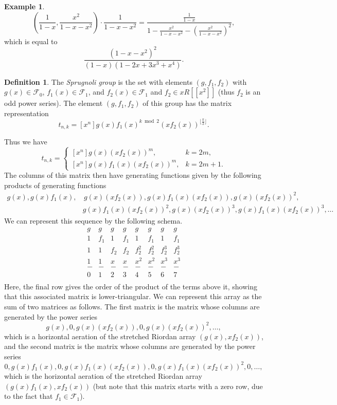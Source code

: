 \documentclass[12pt,reqno]{article}
\theoremstyle{definition}
\newtheorem{definition}[theorem]{Definition}
\newtheorem{example}[theorem]{Example}
\begin{document}
\begin{example}
$$\left(\frac{1}{1-x},\frac{x^2}{1-x-x^2}\right)\cdot \frac{1}{1-x-x^2}=\frac{\frac{1}{1-x}}{1-\frac{x^2}{1-x-x^2}-(\frac{x^2}{1-x-x^2})^2},$$ which is equal to
$$\frac{(1-x-x^2)^2}{(1-x)(1-2x+3x^3+x^4)}.$$
\end{example}

\begin{definition} The \emph{Sprugnoli group} is the set with elements $(g, f_1, f_2)$ with $g(x) \in \mathcal{F}_0$, $f_1(x) \in \mathcal{F}_1$, and $f_2(x) \in \mathcal{F}_1$ and
$f_2 \in xR[[x^2]]$ (thus $f_2$ is an odd power series). The element $(g, f_1, f_2)$ of this group has the matrix representation
$$t_{n,k} = [x^n] g(x)f_1(x)^{k \bmod 2} (xf_2(x))^{\lfloor \frac{k}{2} \rfloor}.$$
\end{definition}
Thus we have
$$
t_{n,k} =
\begin{cases}
  [x^n]g(x)(xf_2(x))^m, & k=2m, \\
  [x^n]g(x)f_1(x)(xf_2(x))^m,  & k=2m+1.
\end{cases}
$$
The columns of this matrix then have generating functions given by the following products of generating functions
\begin{align*}g(x), g(x)f_1(x),&\, g(x)(xf_2(x)), g(x)f_1(x)(xf_2(x)), g(x)(xf_2(x))^2,\\
& g(x)f_1(x)(xf_2(x))^2, g(x)(xf_2(x))^3, g(x)f_1(x)(xf_2(x))^3,\ldots\end{align*} We can represent this sequence by the following schema.
$$
\begin{array}{cccccccc}
g &g & g & g & g & g & g & g\\
1 &f_1 & 1 & f_1 & 1 & f_1 & 1 & f_1 \\
1 &1 & f_2 & f_2 & f_2^2 & f_2^2 & f_2^3 & f_2^3 \\
1 & 1 & x & x & x^2 & x^2 & x^3 & x^3 \\
- & - & - & - & - & - & - & -\\
0 & 1 & 2 & 3 & 4 & 5 & 6 & 7 \\
\end{array}
$$ Here, the final row gives the order of the product of the terms above it, showing that this associated matrix is lower-triangular. We can represent this array as the sum of two matrices as follows. The first matrix is the matrix whose columns are generated by the power series
$$g(x), 0, g(x)(xf_2(x)), 0, g(x)(xf_2(x))^2, \ldots,$$ which is a horizontal aeration of the stretched Riordan array $(g(x), xf_2(x))$, and the second matrix is the matrix whose columns are generated by the power series
$$0,g(x)f_1(x),0, g(x)f_1(x)(xf_2(x)), 0, g(x)f_1(x)(xf_2(x))^2,0,\ldots,$$ which is the horizontal aeration of the stretched Riordan array $(g(x)f_1(x), xf_2(x))$ (but note that this matrix starts with a zero row, due to the fact that $f_1 \in \mathcal{F}_1$).\
\end{document}
